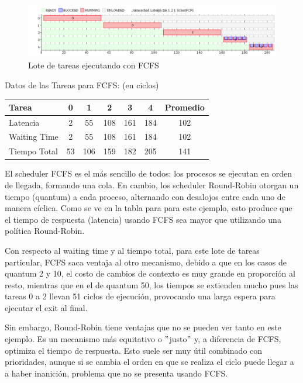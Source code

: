 
\begin{figure}[H]
\caption{Lote de tareas ejecutando con FCFS}
\label{fig:ej6}
\includegraphics[width=1\textwidth]{imgs/ej6.png}
\end{figure}


\par Datos de las Tareas para FCFS: (en ciclos)
\begin{center}
\smallskip
\begin{tabular}{| l | c | c | c | c | c | c |}
\hline  
\textbf{Tarea} & \textbf{0} & \textbf{1} & \textbf{2} & \textbf{3} & \textbf{4}  & \textbf{Promedio} \\ \hline
Latencia & 2 & 55 & 108 & 161 & 184 & 102  \\ \hline
Waiting Time & 2 & 55 & 108 & 161 & 184 & 102  \\ \hline
Tiempo Total & 53 & 106 & 159 & 182 & 205 & 141  \\ \hline
\end{tabular}
\end{center}

\par El scheduler FCFS es el más sencillo de todos: los procesos se ejecutan en orden de llegada, formando una cola. En cambio, los scheduler Round-Robin otorgan un tiempo (quantum) a cada proceso, alternando con desalojos entre cada uno de manera cíclica. Como se ve en la tabla para para este ejemplo, esto produce que el tiempo de respuesta (latencia) usando FCFS sea mayor que utilizando una política Round-Robin. 
\par Con respecto al waiting time y al tiempo total, para este lote de tareas particular, FCFS saca ventaja al otro mecanismo, debido a que en los casos de quantum 2 y 10, el costo de cambios de contexto es muy grande en proporción al resto, mientras que en el de quantum 50, los tiempos se extienden mucho pues las tareas 0 a 2 llevan 51 ciclos de ejecución, provocando una larga espera para ejecutar el exit al final. 
\par Sin embargo, Round-Robin tiene ventajas que no se pueden ver tanto en este ejemplo. Es un mecanismo más equitativo o $"$justo$"$ y, a diferencia de FCFS, optimiza el tiempo de respuesta. Esto suele ser muy útil combinado con prioridades, aunque si se cambia el orden en que se realiza el ciclo puede llegar a a haber inanición, problema que no se presenta usando FCFS.

